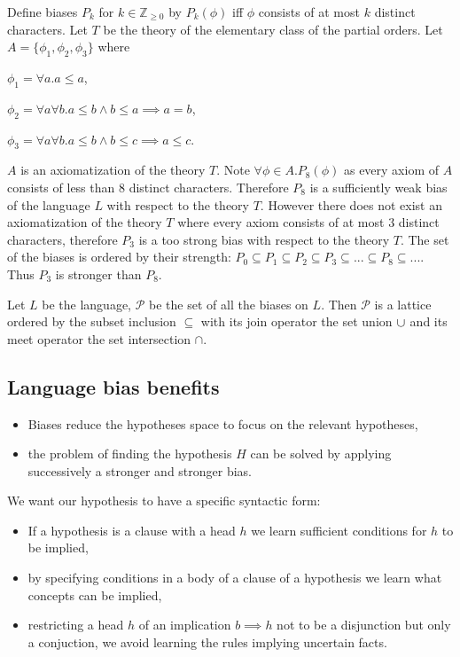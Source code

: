 \begin{exmp}
Define biases $P_k$ for $k \in \mathbb{Z}_{\ge 0}$ by $P_k(\phi)$ iff $\phi$ consists of at most $k$ distinct characters. Let $T$ be the theory of the elementary class of the partial orders. Let $A=\{\phi_1, \phi_2, \phi_3\}$ where

$\phi_1=\forall a. a \le a$,

$\phi_2=\forall a \forall b. a \le b \wedge b \le a \implies a=b$,

$\phi_3=\forall a \forall b. a \le b \wedge b \le c \implies a \le c$.

$A$ is an axiomatization of the theory $T$. Note $\forall \phi \in A. P_8(\phi)$ as every axiom of $A$ consists of less than $8$ distinct characters. Therefore $P_8$ is a sufficiently weak bias of the language $L$ with respect to the theory $T$. However there does not exist an axiomatization of the theory $T$ where every axiom consists of at most $3$ distinct characters, therefore $P_3$ is a too strong bias with respect to the theory $T$. The set of the biases is ordered by their strength:
$P_0 \subseteq P_1 \subseteq P_2 \subseteq P_3 \subseteq ... \subseteq P_8 \subseteq ...$. Thus $P_3$ is stronger than $P_8$.
\end{exmp}

\begin{remark}
Let $L$ be the language, $\mathcal{P}$ be the set of all the biases on $L$. Then $\mathcal{P}$ is a lattice ordered by the subset inclusion $\subseteq$ with its join operator the set union $\cup$ and its meet operator the set intersection $\cap$.
\end{remark}

\subsection{Language bias benefits}
\begin{itemize}
\item Biases reduce the hypotheses space to focus on the relevant hypotheses,
\item the problem of finding the hypothesis $H$ can be solved by applying successively a stronger and stronger bias.
\end{itemize}
We want our hypothesis to have a specific syntactic form:
\begin{itemize}
\item If a hypothesis is a clause with a head $h$ we learn sufficient conditions for $h$ to be implied,
\item by specifying conditions in a body of a clause of a hypothesis we learn what concepts can be implied,
\item restricting a head $h$ of an implication $b \implies h$ not to be a disjunction but only a conjuction, we avoid learning the rules implying uncertain facts.
\end{itemize}

